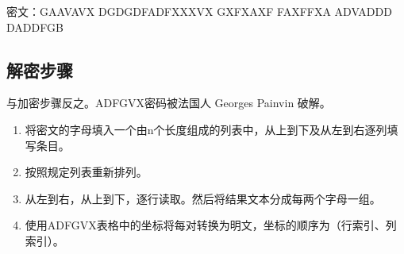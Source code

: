 \documentclass{article}
\begin{document}
密文：{\color{blue}GAAVAVX}  \quad DGDGDFA\quad DFXXXVX \quad  GXFXAXF \quad FAXFFXA \quad ADVADDD \quad DADDFGB 

\subsection{解密步骤}

与加密步骤反之。ADFGVX密码被法国人 Georges Painvin 破解。

\begin{enumerate}
\item 将密文的字母填入一个由n个长度组成的列表中，从上到下及从左到右逐列填写条目。
\item 按照规定列表重新排列。
\item 从左到右，从上到下，逐行读取。然后将结果文本分成每两个字母一组。
\item 使用ADFGVX表格中的坐标将每对转换为明文，坐标的顺序为（行索引、列索引）。
\end{enumerate}
\end{document}
